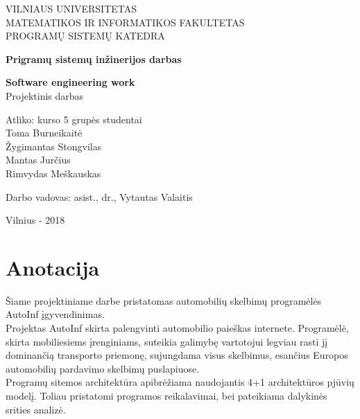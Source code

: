 \documentclass[12pt]{article}
\begin{document}
	\sectionfont{\fontsize{14}{15}\selectfont}
	\renewcommand{\baselinestretch}{1.5} 
	\renewcommand{\contentsname}{\hfil Turinys \hfil}
	\begin{center}
		VILNIAUS UNIVERSITETAS \\  
		MATEMATIKOS IR INFORMATIKOS FAKULTETAS \\ 
		PROGRAMŲ SISTEMŲ KATEDRA \\ 

		\vspace*{\fill}
			{\large \textbf{Prigramų sistemų inžinerijos darbas} \par} \bigskip
			\textbf{Software engineering work} \\ \bigskip
			Projektinis darbas 
		\vspace*{\fill}

		\begin{vwcol}[widths = {0.4, 0.4}, sep = 0cm, justify = raggedright, rule = 0pt]
			 Atliko:
			 kurso 5 grupės studentai \\
			Toma Burneikaitė \\
			Žygimantas Stongvilas \\
			Mantas Jurčius \\
			Rimvydas Meškauskas \\ 
		\end{vwcol}
		\bigskip
		\begin{vwcol}[widths = {0.4, 0.4}, sep = 0cm, justify = raggedright, rule = 0pt]
			Darbo vadovas:
		\newpage
			asist., dr., Vytautas Valaitis
		\end{vwcol}
	\end{center}
	
	\begin{center}
		\mbox{}
		\vfill
		Vilnius - 2018
	\end{center}
	\newpage

	\pagenumbering{arabic}
	\setcounter{page}{2}

	\section*{\hfil Anotacija \hfil}
	
	Šiame projektiniame darbe pristatomas automobilių skelbimų programėlės AutoInf įgyvendinimas. \\
	Projektas AutoInf skirta  palengvinti automobilio paieškas internete. Programėlė, skirta mobiliesiems įrenginiams, suteikia galimybę vartotojui legviau rasti jį dominančią transporto priemonę, sujungdama visus skelbimus, esančius Europos automobilių pardavimo skelbimų puslapiuose. \\
	Programų sitemos architektūra apibrėžiama naudojantis 4+1 architektūros pjūvių modelį. Toliau pristatomi programos reikalavimai, bei pateikiama dalykinės srities analizė. 
	\newpage
\end{document}
